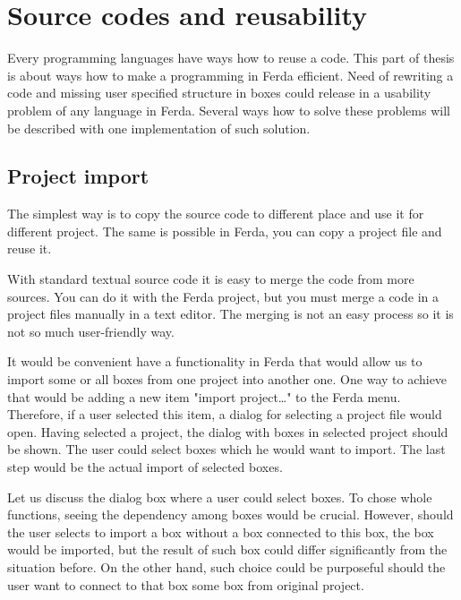 \documentclass[a4paper,12pt]{book}
\begin{document}
\section{Source codes and reusability}
\label{sec:reusability}
Every programming languages have ways how to reuse a code. This part of thesis is about ways how to make a programming in Ferda efficient. Need of rewriting a code and missing user specified structure in boxes could release in a usability problem of any language in Ferda. Several ways how to solve these problems will be described with one implementation of such solution.

\subsection{Project import}
The simplest way is to copy the source code to different place and use it for different project. The same is possible in Ferda, you can copy a project file and reuse it.

With standard textual source code it is easy to merge the code from more sources. You can do it with the Ferda project, but you must merge a code in a project files manually in a text editor. The merging is not an easy process so it is not so much user-friendly way.

It would be convenient have a functionality in Ferda that would allow us to import some or all boxes from one project into another one. One way to achieve that would be adding a new item "import project\dots" to the Ferda menu. Therefore, if a user selected this item, a dialog for selecting a project file would open. Having selected a project, the dialog with boxes in selected project should be shown. The user could select boxes which he would want to import. The last step would be the actual import of selected boxes.

Let us discuss the dialog box where a user could select boxes. To chose whole functions, seeing the dependency among boxes would be crucial. However, should the user selects to import a box without a box connected to this box, the box would be imported, but the result of such box could differ significantly from the situation before. On the other hand, such choice could be purposeful should the user want to connect to that box some box from original project.
\end{document}
